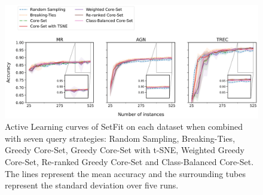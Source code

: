 \documentclass[english,bachelor,ul]{webisthesis} %
\begin{document}
\begin{figure}[htbp]
    \centering
    \includegraphics[width=1\textwidth]{img/setfit-plots-1.png}
    \caption{Active Learning curves of SetFit on each dataset when combined with seven query strategies: Random Sampling, Breaking-Ties, Greedy Core-Set, Greedy Core-Set with t-SNE, Weighted Greedy Core-Set, Re-ranked Greedy Core-Set and Class-Balanced Core-Set. The lines represent the mean accuracy and the surrounding tubes represent the standard deviation over five runs.}
    \label{fig:setfit-curves}
\end{figure}

\end{document}
